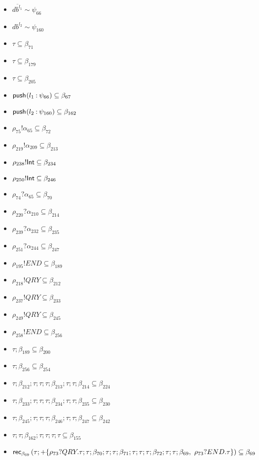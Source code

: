 \documentclass{article}
\begin{document}
\begin{itemize}
\item $ \overline{{db}^{l_{1}}} \sim\psi_{66} $
\item $ {db}^{l_{2}} \sim\psi_{160} $
\item $ \tau \subseteq \beta_{71} $
\item $ \tau \subseteq \beta_{179} $
\item $ \tau \subseteq \beta_{205} $
\item $ \pusho{ l_{1}} {\psi_{66}}{} \subseteq \beta_{67} $
\item $ \pusho{ l_{2}} {\psi_{160}}{} \subseteq \beta_{162} $
\item $ \rho_{75}!\alpha_{65} \subseteq \beta_{72} $
\item $ \rho_{219}!\alpha_{209} \subseteq \beta_{213} $
\item $ \rho_{238}!\tint \subseteq \beta_{234} $
\item $ \rho_{250}!\tint \subseteq \beta_{246} $
\item $ \rho_{74}?\alpha_{65} \subseteq \beta_{70} $
\item $ \rho_{220}?\alpha_{210} \subseteq \beta_{214} $
\item $ \rho_{239}?\alpha_{232} \subseteq \beta_{235} $
\item $ \rho_{251}?\alpha_{244} \subseteq \beta_{247} $
\item $ \rho_{195}!END \subseteq \beta_{189} $
\item $ \rho_{218}!QRY \subseteq \beta_{212} $
\item $ \rho_{237}!QRY \subseteq \beta_{233} $
\item $ \rho_{249}!QRY \subseteq \beta_{245} $
\item $ \rho_{258}!END \subseteq \beta_{256} $
\item $ \tau; \beta_{189} \subseteq \beta_{200} $
\item $ \tau; \beta_{256} \subseteq \beta_{254} $
\item $ \tau; \beta_{212}; \tau; \tau; \tau; \beta_{213}; \tau; \tau; \beta_{214} \subseteq \beta_{224} $
\item $ \tau; \beta_{233}; \tau; \tau; \tau; \beta_{234}; \tau; \tau; \beta_{235} \subseteq \beta_{230} $
\item $ \tau; \beta_{245}; \tau; \tau; \tau; \beta_{246}; \tau; \tau; \beta_{247} \subseteq \beta_{242} $
\item $ \tau; \tau; \beta_{162}; \tau; \tau; \tau; \tau \subseteq \beta_{155} $
\item $ \orec{ (\tau; + \{\rho_{73}?QRY.\tau; \tau; \beta_{70}; \tau; \tau; \beta_{71}; \tau; \tau; \tau; \beta_{72}; \tau; \tau; \beta_{69},~\rho_{73}?END.\tau \})}{\beta_{69}} \subseteq \beta_{69} $

\end{itemize}
\end{document}
